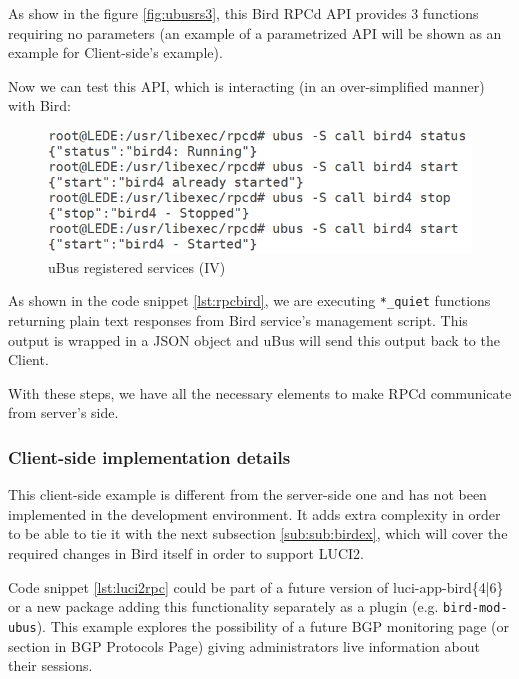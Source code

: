 As show in the figure \ref{fig:ubusrs3}, this Bird RPCd API provides 3 functions requiring no parameters (an example of a parametrized API will be shown as an example for Client-side's example).

Now we can test this API, which is interacting (in an over-simplified manner) with Bird:

\begin{figure}[H]
    \centering
    \includegraphics[width=\textwidth]{images/luci2/step4}
    \caption{uBus registered services (IV)}
    \label{fig:ubusrs4}
\end{figure}

As shown in the code snippet \ref{lst:rpcbird}, we are executing \texttt{*\_quiet} functions returning plain text responses from Bird service's management script. This output is wrapped in a JSON object and uBus will send this output back to the Client.

With these steps, we have all the necessary elements to make RPCd communicate from server's side.

\subsubsection{Client-side implementation details}

This client-side example is different from the server-side one and has not been implemented in the development environment. It adds extra complexity in order to be able to tie it with the next subsection \ref{sub:sub:birdex}, which will cover the required changes in Bird itself in order to support LUCI2.

Code snippet \ref{lst:luci2rpc} could be part of a future version of luci-app-bird\{4|6\} or a new package adding this functionality separately as a plugin (e.g. \texttt{bird-mod-ubus}). This example explores the possibility of a future BGP monitoring page (or section in BGP Protocols Page) giving administrators live information about their sessions.

 


